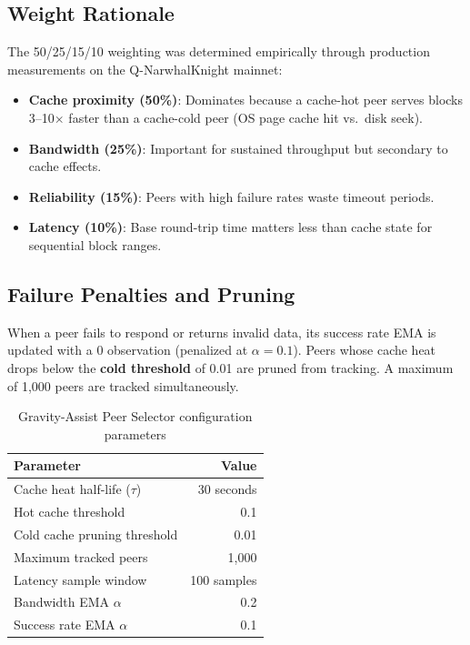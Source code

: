 \documentclass[11pt,a4paper]{article}
\begin{document}
\subsection{Weight Rationale}

The 50/25/15/10 weighting was determined empirically through production measurements on the Q-NarwhalKnight mainnet:

\begin{itemize}
    \item \textbf{Cache proximity (50\%)}: Dominates because a cache-hot peer serves blocks 3--10$\times$ faster than a cache-cold peer (OS page cache hit vs.\ disk seek).
    \item \textbf{Bandwidth (25\%)}: Important for sustained throughput but secondary to cache effects.
    \item \textbf{Reliability (15\%)}: Peers with high failure rates waste timeout periods.
    \item \textbf{Latency (10\%)}: Base round-trip time matters less than cache state for sequential block ranges.
\end{itemize}

\subsection{Failure Penalties and Pruning}

When a peer fails to respond or returns invalid data, its success rate EMA is updated with a 0 observation (penalized at $\alpha = 0.1$). Peers whose cache heat drops below the \textbf{cold threshold} of 0.01 are pruned from tracking. A maximum of 1,000 peers are tracked simultaneously.

\begin{table}[h]
\centering
\begin{tabular}{lr}
\toprule
\textbf{Parameter} & \textbf{Value} \\
\midrule
Cache heat half-life ($\tau$) & 30 seconds \\
Hot cache threshold & 0.1 \\
Cold cache pruning threshold & 0.01 \\
Maximum tracked peers & 1,000 \\
Latency sample window & 100 samples \\
Bandwidth EMA $\alpha$ & 0.2 \\
Success rate EMA $\alpha$ & 0.1 \\
\bottomrule
\end{tabular}
\caption{Gravity-Assist Peer Selector configuration parameters}
\label{tab:gravity_params}
\end{table}
\end{document}
